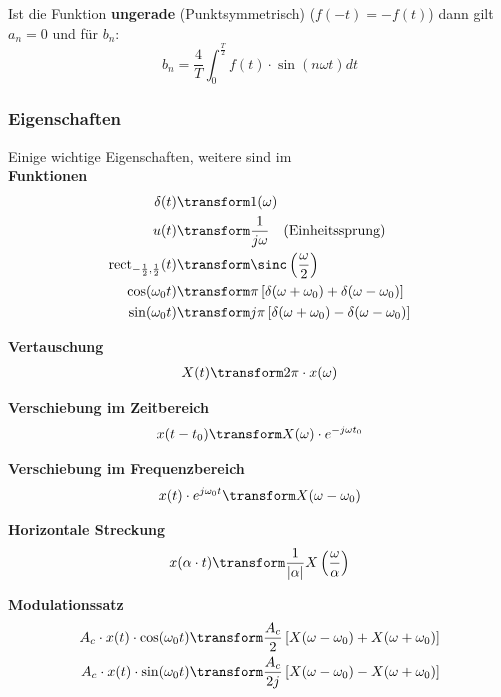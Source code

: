 \noindent Ist die Funktion \textbf{ungerade} (Punktsymmetrisch) ($f(-t) = -f(t)$) dann gilt $a_n = 0$ und für $b_n$:
\[
b_n = \frac{4}{T}\int_{0}^{\frac{T}{2}}f(t) \cdot \sin(n\omega t)dt 
\]


\subsubsection{Eigenschaften}
Einige wichtige Eigenschaften, weitere sind im \\
\noindent\textbf{Funktionen}
\begin{align*}
	\delta(t) &\transform 1(\omega) \\
	u(t) &\transform \frac{1}{j\omega} \quad\text{(Einheitssprung)}\\
	\text{rect}_{-\frac{1}{2},\frac{1}{2}}(t) &\transform \sinc\left(\frac{\omega}{2}\right) \\
	\cos(\omega_0 t) &\transform \pi\left[\delta(\omega + \omega_0) + \delta(\omega - \omega_0)\right] \\
	\sin(\omega_0 t) &\transform j\pi\left[\delta(\omega + \omega_0) - \delta(\omega - \omega_0)\right]
\end{align*}

\noindent\textbf{Vertauschung}
\begin{align*}
	X(t) \transform 2\pi \cdot x(\-\omega)
\end{align*}

\noindent\textbf{Verschiebung im Zeitbereich}
\begin{align*}
	x(t - t_0) \transform X(\omega) \cdot e^{-j\omega t_0} 
\end{align*}

\noindent\textbf{Verschiebung im Frequenzbereich}
\begin{align*}
	x(t) \cdot e^{j\omega_0 t} \transform X(\omega - \omega_0)
\end{align*}

\noindent\textbf{Horizontale Streckung}
\begin{align*}
	x(\alpha \cdot t) \transform \frac{1}{|\alpha|}X\left(\frac{\omega}{\alpha}\right)
\end{align*}

\noindent\textbf{Modulationssatz}
\begin{align*}
	A_c \cdot x(t) \cdot \cos(\omega_0t) &\transform \frac{A_c}{2}\left[X(\omega - \omega_0) + X(\omega + \omega_0)\right] \\
	A_c \cdot x(t) \cdot \sin(\omega_0t) &\transform \frac{A_c}{2j}\left[X(\omega - \omega_0) - X(\omega + \omega_0)\right]
\end{align*}

